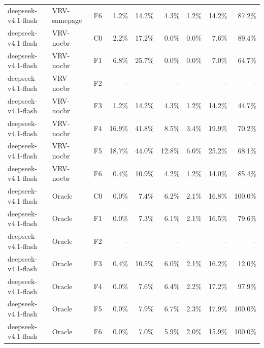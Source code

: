 \begin{tabular}{lllrrrrrr}
deepseek-v4.1-flash & VRV-samepage & F6 & 1.2\% & 14.2\% & 4.3\% & 1.2\% & 14.2\% & 87.2\% \\
deepseek-v4.1-flash & VRV-nocbr & C0 & 2.2\% & 17.2\% & 0.0\% & 0.0\% & 7.6\% & 89.4\% \\
deepseek-v4.1-flash & VRV-nocbr & F1 & 6.8\% & 25.7\% & 0.0\% & 0.0\% & 7.0\% & 64.7\% \\
deepseek-v4.1-flash & VRV-nocbr & F2 & -- & -- & -- & -- & -- & -- \\
deepseek-v4.1-flash & VRV-nocbr & F3 & 1.2\% & 14.2\% & 4.3\% & 1.2\% & 14.2\% & 44.7\% \\
deepseek-v4.1-flash & VRV-nocbr & F4 & 16.9\% & 41.8\% & 8.5\% & 3.4\% & 19.9\% & 70.2\% \\
deepseek-v4.1-flash & VRV-nocbr & F5 & 18.7\% & 44.0\% & 12.8\% & 6.0\% & 25.2\% & 68.1\% \\
deepseek-v4.1-flash & VRV-nocbr & F6 & 0.4\% & 10.9\% & 4.2\% & 1.2\% & 14.0\% & 85.4\% \\
deepseek-v4.1-flash & Oracle & C0 & 0.0\% & 7.4\% & 6.2\% & 2.1\% & 16.8\% & 100.0\% \\
deepseek-v4.1-flash & Oracle & F1 & 0.0\% & 7.3\% & 6.1\% & 2.1\% & 16.5\% & 79.6\% \\
deepseek-v4.1-flash & Oracle & F2 & -- & -- & -- & -- & -- & -- \\
deepseek-v4.1-flash & Oracle & F3 & 0.4\% & 10.5\% & 6.0\% & 2.1\% & 16.2\% & 12.0\% \\
deepseek-v4.1-flash & Oracle & F4 & 0.0\% & 7.6\% & 6.4\% & 2.2\% & 17.2\% & 97.9\% \\
deepseek-v4.1-flash & Oracle & F5 & 0.0\% & 7.9\% & 6.7\% & 2.3\% & 17.9\% & 100.0\% \\
deepseek-v4.1-flash & Oracle & F6 & 0.0\% & 7.0\% & 5.9\% & 2.0\% & 15.9\% & 100.0\% \\
\bottomrule
\end{tabular}

